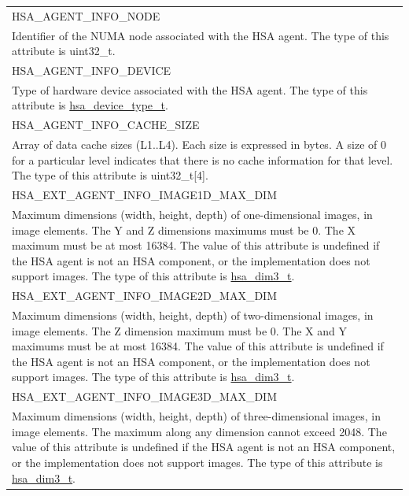 \documentclass[final,oneside]{book}
\newcommand{\reftyp}[1]{#1}
\newcommand{\refenu}[1]{\reftyp{#1}}
\begin{document}
\begin{longtable}{@{\hspace{2em}}p{\linewidth-2em}}
\hspace{-2em}\refenu{HSA_\-AGENT_\-INFO_\-NODE}\\Identifier of the NUMA node associated with the HSA agent. The type of this attribute is uint32_\-t.\\[2mm]
\hspace{-2em}\refenu{HSA_\-AGENT_\-INFO_\-DEVICE}\\Type of hardware device associated with the HSA agent. The type of this attribute is \hyperlink{group__agentinfo_1ga5e6c855643435ea1c2c7dc3fa2a123f0}{hsa_\-device_\-type_\-t}.\\[2mm]
\hspace{-2em}\refenu{HSA_\-AGENT_\-INFO_\-CACHE_\-SIZE}\\Array of data cache sizes (L1..L4). Each size is expressed in bytes. A size of 0 for a particular level indicates that there is no cache information for that level. The type of this attribute is uint32_\-t[4].\\[2mm]
\hspace{-2em}\refenu{HSA_\-EXT_\-AGENT_\-INFO_\-IMAGE1D_\-MAX_\-DIM}\\Maximum dimensions (width, height, depth) of one-dimensional images, in image elements. The Y and Z dimensions maximums must be 0. The X maximum must be at most 16384. The value of this attribute is undefined if the HSA agent is not an HSA component, or the implementation does not support images. The type of this attribute is \hyperlink{group__common_1ga6f7883588491965c45382cd996351aa2}{hsa_\-dim3_\-t}.\\[2mm]
\hspace{-2em}\refenu{HSA_\-EXT_\-AGENT_\-INFO_\-IMAGE2D_\-MAX_\-DIM}\\Maximum dimensions (width, height, depth) of two-dimensional images, in image elements. The Z dimension maximum must be 0. The X and Y maximums must be at most 16384. The value of this attribute is undefined if the HSA agent is not an HSA component, or the implementation does not support images. The type of this attribute is \hyperlink{group__common_1ga6f7883588491965c45382cd996351aa2}{hsa_\-dim3_\-t}.\\[2mm]
\hspace{-2em}\refenu{HSA_\-EXT_\-AGENT_\-INFO_\-IMAGE3D_\-MAX_\-DIM}\\Maximum dimensions (width, height, depth) of three-dimensional images, in image elements. The maximum along any dimension cannot exceed 2048. The value of this attribute is undefined if the HSA agent is not an HSA component, or the implementation does not support images. The type of this attribute is \hyperlink{group__common_1ga6f7883588491965c45382cd996351aa2}{hsa_\-dim3_\-t}.\\[2mm]

\end{longtable}
\end{document}

